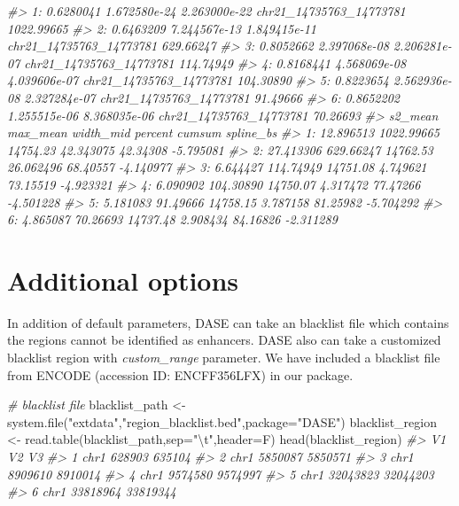 \documentclass[
]{article}
\newenvironment{Shaded}{\begin{snugshade}}{\end{snugshade}}
\newcommand{\AttributeTok}[1]{\textcolor[rgb]{0.77,0.63,0.00}{#1}}
\newcommand{\CommentTok}[1]{\textcolor[rgb]{0.56,0.35,0.01}{\textit{#1}}}
\newcommand{\FunctionTok}[1]{\textcolor[rgb]{0.00,0.00,0.00}{#1}}
\newcommand{\NormalTok}[1]{#1}
\newcommand{\OtherTok}[1]{\textcolor[rgb]{0.56,0.35,0.01}{#1}}
\newcommand{\SpecialCharTok}[1]{\textcolor[rgb]{0.00,0.00,0.00}{#1}}
\newcommand{\StringTok}[1]{\textcolor[rgb]{0.31,0.60,0.02}{#1}}
\begin{document}
\begin{Shaded}
\begin{Highlighting}[]
\CommentTok{\#\textgreater{} 1: 0.6280041 1.672580e{-}24 2.263000e{-}22 chr21\_14735763\_14773781 1022.99665}
\CommentTok{\#\textgreater{} 2: 0.6463209 7.244567e{-}13 1.849415e{-}11 chr21\_14735763\_14773781  629.66247}
\CommentTok{\#\textgreater{} 3: 0.8052662 2.397068e{-}08 2.206281e{-}07 chr21\_14735763\_14773781  114.74949}
\CommentTok{\#\textgreater{} 4: 0.8168441 4.568069e{-}08 4.039606e{-}07 chr21\_14735763\_14773781  104.30890}
\CommentTok{\#\textgreater{} 5: 0.8223654 2.562936e{-}08 2.327284e{-}07 chr21\_14735763\_14773781   91.49666}
\CommentTok{\#\textgreater{} 6: 0.8652202 1.255515e{-}06 8.368035e{-}06 chr21\_14735763\_14773781   70.26693}
\CommentTok{\#\textgreater{}      s2\_mean   max\_mean width\_mid   percent   cumsum spline\_bs}
\CommentTok{\#\textgreater{} 1: 12.896513 1022.99665  14754.23 42.343075 42.34308 {-}5.795081}
\CommentTok{\#\textgreater{} 2: 27.413306  629.66247  14762.53 26.062496 68.40557 {-}4.140977}
\CommentTok{\#\textgreater{} 3:  6.644427  114.74949  14751.08  4.749621 73.15519 {-}4.923321}
\CommentTok{\#\textgreater{} 4:  6.090902  104.30890  14750.07  4.317472 77.47266 {-}4.501228}
\CommentTok{\#\textgreater{} 5:  5.181083   91.49666  14758.15  3.787158 81.25982 {-}5.704292}
\CommentTok{\#\textgreater{} 6:  4.865087   70.26693  14737.48  2.908434 84.16826 {-}2.311289}
\end{Highlighting}
\end{Shaded}

\hypertarget{additional-options}{%
\section{Additional options}\label{additional-options}}

In addition of default parameters, DASE can take an blacklist file which
contains the regions cannot be identified as enhancers. DASE also can
take a customized blacklist region with \emph{custom\_range} parameter.
We have included a blacklist file from ENCODE (accession ID:
ENCFF356LFX) in our package.

\begin{Shaded}
\begin{Highlighting}[]
\CommentTok{\# blacklist file}
\NormalTok{blacklist\_path }\OtherTok{\textless{}{-}} \FunctionTok{system.file}\NormalTok{(}\StringTok{"extdata"}\NormalTok{,}\StringTok{"region\_blacklist.bed"}\NormalTok{,}\AttributeTok{package=}\StringTok{"DASE"}\NormalTok{)}
\NormalTok{blacklist\_region }\OtherTok{\textless{}{-}} \FunctionTok{read.table}\NormalTok{(blacklist\_path,}\AttributeTok{sep=}\StringTok{"}\SpecialCharTok{\textbackslash{}t}\StringTok{"}\NormalTok{,}\AttributeTok{header=}\NormalTok{F)}
\FunctionTok{head}\NormalTok{(blacklist\_region)}
\CommentTok{\#\textgreater{}     V1       V2       V3}
\CommentTok{\#\textgreater{} 1 chr1   628903   635104}
\CommentTok{\#\textgreater{} 2 chr1  5850087  5850571}
\CommentTok{\#\textgreater{} 3 chr1  8909610  8910014}
\CommentTok{\#\textgreater{} 4 chr1  9574580  9574997}
\CommentTok{\#\textgreater{} 5 chr1 32043823 32044203}
\CommentTok{\#\textgreater{} 6 chr1 33818964 33819344}
\end{Highlighting}
\end{Shaded}
\end{document}
